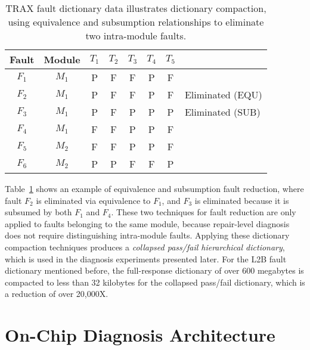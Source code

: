 \begin{table}[hbtp]
\centering
\begin{tabular*}{0.9\columnwidth}{@{\extracolsep{\fill}}cccccccl}
\toprule
Fault&Module&$T_1$&$T_2$&$T_3$&$T_4$&$T_5$&\\
\midrule
$F_1$&$M_1$&P&F&F&P&F&\\
$F_2$&$M_1$&P&F&F&P&F&Eliminated (EQU)\\
$F_3$&$M_1$&P&F&P&P&P&Eliminated (SUB)\\
$F_4$&$M_1$&F&F&P&P&F&\\
\midrule
$F_5$&$M_2$&F&F&P&P&F&\\
$F_6$&$M_2$&P&P&F&F&P&\\
\bottomrule
\end{tabular*}
\caption{TRAX fault dictionary data illustrates dictionary compaction, using equivalence and subsumption relationships to eliminate two intra-module faults.}
\label{table:intro_fault_resp}
\end{table}

Table~\ref{table:intro_fault_resp} shows an example of equivalence and subsumption fault reduction, where fault $F_2$ is eliminated via equivalence to $F_1$, and $F_3$ is eliminated because it is subsumed by both $F_1$ and $F_4$.
%
These two techniques for fault reduction are only applied to faults belonging to the same module, because repair-level diagnosis does not require distinguishing intra-module faults.
%
Applying these dictionary compaction techniques produces a \textit{collapsed pass/fail hierarchical dictionary}, which is used in the diagnosis experiments presented later.
%
For the L2B fault dictionary mentioned before, the full-response dictionary of over 600 megabytes is compacted to less than 32 kilobytes for the collapsed pass/fail dictionary, which is a reduction of over 20,000X.


\section{On-Chip Diagnosis Architecture}
\label{sec:intro_diag}

